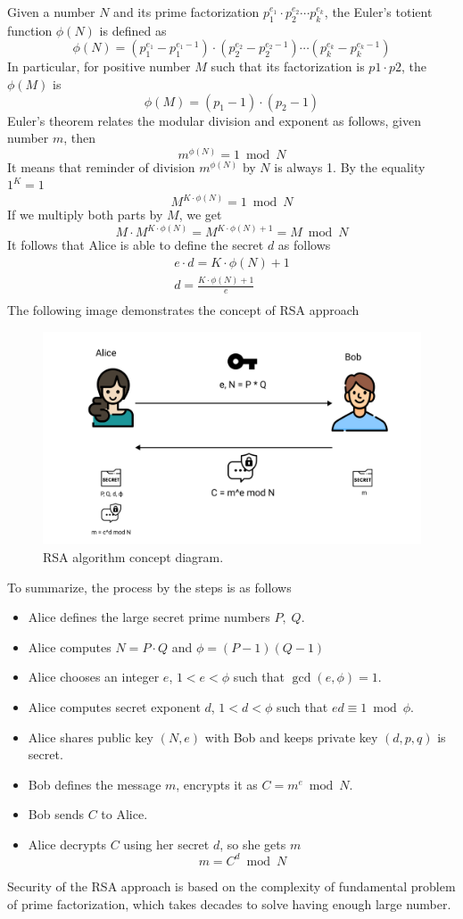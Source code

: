 Given a number $N$ and its prime factorization $p_1^{e_1}\cdot p_2^{e_2} \cdots p_k^{e_k}$, the Euler's totient function
$\phi(N)$ is defined as
\[
    \phi(N) = (p_1^{e_1} - p_1^{e_1 - 1}) \cdot (p_2^{e_2} - p_2^{e_2 - 1}) \cdots (p_k^{e_k} - p_k^{e_k - 1})
\]
In particular, for positive number $M$ such that its factorization is $p1 \cdot p2$, the $\phi(M)$ is
\[
    \phi(M) = (p_1 -1) \cdot (p_2 - 1)
\]
Euler's theorem relates the modular division and exponent as follows, given number $m$, then
\[
    m^{\phi(N)} = 1 \bmod N
\]
It means that reminder of division $m^{\phi(N)}$ by $N$ is always 1.
By the equality $1^K = 1$
\[
    M^{K \cdot \phi(N)} = 1 \bmod N
\]
If we multiply both parts by $M$, we get
\[
    M \cdot M^{K \cdot \phi(N)} = M^{K \cdot \phi(N) + 1} = M \bmod N
\]
It follows that Alice is able to define the secret $d$ as follows
\begin{gather*}
    e \cdot d = K \cdot \phi(N) + 1\\
    d = \frac{K \cdot \phi(N) + 1}{e}\\
\end{gather*}
The following image demonstrates the concept of RSA approach
\begin{figure}[H]
    \centering
    \includegraphics[width=1\textwidth]{Pictures/12_RSA_encryption_concept_diagram}
    \caption{RSA algorithm concept diagram.}\label{fig:figure8}
\end{figure}
To summarize, the process by the steps is as follows
\begin{itemize}
    \item Alice defines the large secret prime numbers $P, \; Q$.
    \item Alice computes $N = P \cdot Q$ and $\phi = (P-1)(Q-1)$
    \item Alice chooses an integer $e$, $1<e< \phi$ such that $\gcd(e, \phi) = 1$.
    \item Alice computes secret exponent $d$, $1<d< \phi$ such that $ed \equiv 1 \bmod \phi$.
    \item Alice shares public key $(N,e)$ with Bob and keeps private key $(d, p, q)$ is secret.
    \item Bob defines the message $m$, encrypts it as $C = m^{e} \bmod N$.
    \item Bob sends $C$ to Alice.
    \item Alice decrypts $C$ using her secret $d$, so she gets $m$
    \[
        m = C^d \bmod N
    \]
\end{itemize}
Security of the RSA approach is based on the complexity of fundamental problem of prime factorization,
which takes decades to solve having enough large number.